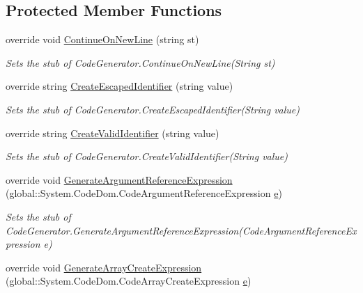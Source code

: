 \subsection*{Protected Member Functions}
\begin{DoxyCompactItemize}
\item 
override void \hyperlink{class_system_1_1_code_dom_1_1_compiler_1_1_fakes_1_1_stub_code_generator_a002912325751adfe89b659f62fb56cdd}{Continue\-On\-New\-Line} (string st)
\begin{DoxyCompactList}\small\item\em Sets the stub of Code\-Generator.\-Continue\-On\-New\-Line(\-String st)\end{DoxyCompactList}\item 
override string \hyperlink{class_system_1_1_code_dom_1_1_compiler_1_1_fakes_1_1_stub_code_generator_aa36602b43c71c087cebb1127784c72e2}{Create\-Escaped\-Identifier} (string value)
\begin{DoxyCompactList}\small\item\em Sets the stub of Code\-Generator.\-Create\-Escaped\-Identifier(\-String value)\end{DoxyCompactList}\item 
override string \hyperlink{class_system_1_1_code_dom_1_1_compiler_1_1_fakes_1_1_stub_code_generator_a11291a42f8c5f6b258be13659c8b5c11}{Create\-Valid\-Identifier} (string value)
\begin{DoxyCompactList}\small\item\em Sets the stub of Code\-Generator.\-Create\-Valid\-Identifier(\-String value)\end{DoxyCompactList}\item 
override void \hyperlink{class_system_1_1_code_dom_1_1_compiler_1_1_fakes_1_1_stub_code_generator_a0e7326e41c2e5b6f197b303eb1cd3278}{Generate\-Argument\-Reference\-Expression} (global\-::\-System.\-Code\-Dom.\-Code\-Argument\-Reference\-Expression \hyperlink{jquery-1_810_82_8min_8js_a2c038346d47955cbe2cb91e338edd7e1}{e})
\begin{DoxyCompactList}\small\item\em Sets the stub of Code\-Generator.\-Generate\-Argument\-Reference\-Expression(\-Code\-Argument\-Reference\-Expression e)\end{DoxyCompactList}\item 
override void \hyperlink{class_system_1_1_code_dom_1_1_compiler_1_1_fakes_1_1_stub_code_generator_ac25891308dc6ef5a32505e02412daf9b}{Generate\-Array\-Create\-Expression} (global\-::\-System.\-Code\-Dom.\-Code\-Array\-Create\-Expression \hyperlink{jquery-1_810_82_8min_8js_a2c038346d47955cbe2cb91e338edd7e1}{e})

\end{DoxyCompactItemize}
